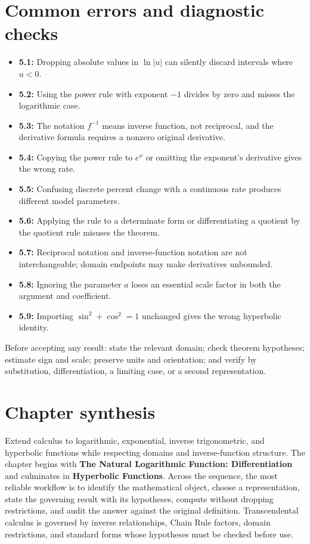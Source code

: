 \documentclass[11pt]{article}
\begin{document}
\section{Common errors and diagnostic checks}
\begin{warningbox}
\begin{itemize}
\item \textbf{5.1:} Dropping absolute values in $\ln|u|$ can silently discard intervals where $u<0$.
\item \textbf{5.2:} Using the power rule with exponent $-1$ divides by zero and misses the logarithmic case.
\item \textbf{5.3:} The notation $f^{-1}$ means inverse function, not reciprocal, and the derivative formula requires a nonzero original derivative.
\item \textbf{5.4:} Copying the power rule to $e^x$ or omitting the exponent's derivative gives the wrong rate.
\item \textbf{5.5:} Confusing discrete percent change with a continuous rate produces different model parameters.
\item \textbf{5.6:} Applying the rule to a determinate form or differentiating a quotient by the quotient rule misuses the theorem.
\item \textbf{5.7:} Reciprocal notation and inverse-function notation are not interchangeable; domain endpoints may make derivatives unbounded.
\item \textbf{5.8:} Ignoring the parameter $a$ loses an essential scale factor in both the argument and coefficient.
\item \textbf{5.9:} Importing $\sin^2+\cos^2=1$ unchanged gives the wrong hyperbolic identity.
\end{itemize}
\end{warningbox}
\begin{checkbox}
Before accepting any result: state the relevant domain; check theorem hypotheses; estimate sign and scale; preserve units and orientation; and verify by substitution, differentiation, a limiting case, or a second representation.
\end{checkbox}

\section{Chapter synthesis}
Extend calculus to logarithmic, exponential, inverse trigonometric, and hyperbolic functions while respecting domains and inverse-function structure. The chapter begins with \textbf{The Natural Logarithmic Function: Differentiation} and culminates in \textbf{Hyperbolic Functions}. Across the sequence, the most reliable workflow is to identify the mathematical object, choose a representation, state the governing result with its hypotheses, compute without dropping restrictions, and audit the answer against the original definition. Transcendental calculus is governed by inverse relationships, Chain Rule factors, domain restrictions, and standard forms whose hypotheses must be checked before use.
\end{document}
